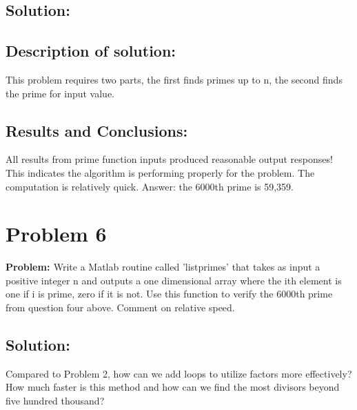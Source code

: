 \documentclass[12pt]{article} %
\begin{document}
\subsection{Solution:}








\subsection{Description of solution:}
This problem requires two parts, the first finds primes up to n, the second finds the prime for input value.

\subsection{Results and Conclusions:}
All results from prime function inputs produced reasonable output responses! This indicates the algorithm is performing properly for the problem.
The computation is relatively quick. Answer: the 6000th prime is 59,359.

\section {Problem 6}
{\bf{Problem: }}
Write a Matlab routine called 'listprimes' that takes as input a positive integer n and outputs a one dimensional array where the ith element is one if i is prime, zero if it is not. Use this function to verify the 6000th prime from question four above. Comment on relative speed.

\hfill
\newpage

\subsection{Solution:}
Compared to Problem 2, how can we add loops to utilize factors more effectively?  How much faster is this method and how can we find the most divisors beyond five hundred thousand?
\end{document}
